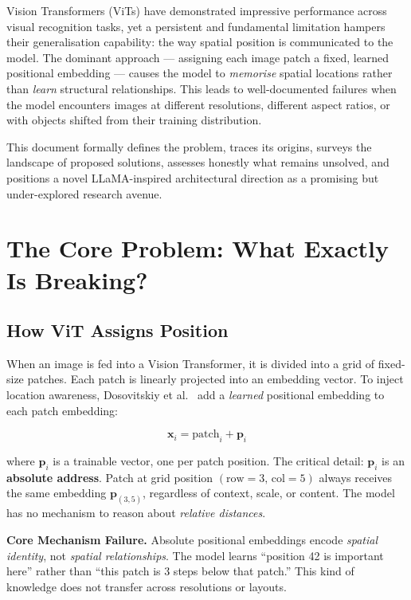 \documentclass[12pt,a4paper]{article}
\begin{document}
Vision Transformers (ViTs) have demonstrated impressive performance across
visual recognition tasks, yet a persistent and fundamental limitation hampers
their generalisation capability: the way spatial position is communicated to
the model. The dominant approach --- assigning each image patch a fixed,
learned positional embedding --- causes the model to \emph{memorise} spatial
locations rather than \emph{learn} structural relationships. This leads to
well-documented failures when the model encounters images at different
resolutions, different aspect ratios, or with objects shifted from their
training distribution.

This document formally defines the problem, traces its origins, surveys the
landscape of proposed solutions, assesses honestly what remains unsolved, and
positions a novel LLaMA-inspired architectural direction as a promising but
under-explored research avenue.

\section{The Core Problem: What Exactly Is Breaking?}
\label{sec:problem}

\subsection{How ViT Assigns Position}

When an image is fed into a Vision Transformer, it is divided into a grid of
fixed-size patches. Each patch is linearly projected into an embedding
vector. To inject location awareness, Dosovitskiy et al.\ \cite{vit2020} add
a \emph{learned} positional embedding to each patch embedding:

\begin{equation}
  \mathbf{x}_i = \mathrm{patch}_i + \mathbf{p}_i
  \label{eq:absolute}
\end{equation}

where $\mathbf{p}_i$ is a trainable vector, one per patch position.
The critical detail: $\mathbf{p}_i$ is an \textbf{absolute address}.
Patch at grid position $(\mathrm{row}=3,\,\mathrm{col}=5)$ always receives
the same embedding $\mathbf{p}_{(3,5)}$, regardless of context, scale, or
content. The model has no mechanism to reason about \emph{relative distances}.

\begin{warning}
  \textbf{Core Mechanism Failure.} Absolute positional embeddings encode
  \emph{spatial identity}, not \emph{spatial relationships}. The model learns
  ``position 42 is important here'' rather than ``this patch is 3 steps below
  that patch.'' This kind of knowledge does not transfer across resolutions or
  layouts.
\end{warning}
\end{document}
